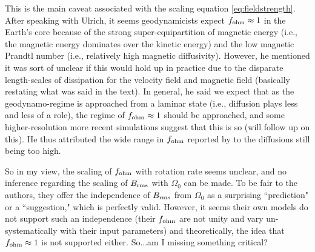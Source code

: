 \documentclass[12pt]{article} %
\begin{document}
This is the main caveat associated with the scaling equation \eqref{eq:fieldstrength}. After speaking with Ulrich, it seems geodynamicists expect $f_{\rm{ohm}}\approx1$ in the Earth's core because of the strong super-equipartition of magnetic energy (i.e., the magnetic energy dominates over the kinetic energy) and the low magnetic Prandtl number (i.e., relatively high magnetic diffusivity). However, he mentioned it was sort of unclear if this would hold up in practice due to the disparate length-scales of dissipation for the velocity field and magnetic field (basically restating what was said in the text). In general, he said we expect that as the geodynamo-regime is approached from a laminar state (i.e., diffusion plays less and less of a role), the regime of $f_{\rm{ohm}}\approx1$ should be approached, and some higher-resolution more recent simulations suggest that this is so (will follow up on this).  He thus attributed the wide range in $f_{\rm{ohm}}$ reported by \citet{Christensen2006} to the diffusions still being too high. 


So in my view, the scaling of $f_{\rm{ohm}}$ with rotation rate seems unclear, and no inference regarding the scaling of $B_{\rm{rms}}$ with $\Omega_0$  can be made. To be fair to the authors, they offer the independence of $B_{\rm{rms}}$ from $\Omega_0$ as a surprising ``prediction" or a ``suggestion," which is perfectly valid. However, it seems their own models do not support such an independence (their $f_{\rm{ohm}}$ are not unity and vary un-systematically with their input parameters) and theoretically, the idea that $f_{\rm{ohm}}\approx1$ is not supported either. So...am I missing something critical? 


\end{document}

